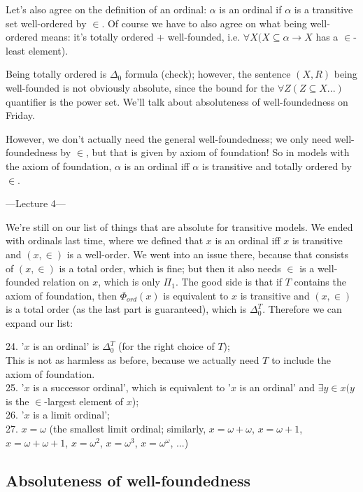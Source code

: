 \documentclass[a4paper]{article}
\begin{document}
Let's also agree on the definition of an ordinal: $\alpha$ is an ordinal if $\alpha$ is a transitive set well-ordered by $\in$. Of course we have to also agree on what being well-ordered means: it's totally ordered + well-founded, i.e. $\forall X (X \subseteq \alpha \to X$ has a $\in$-least element).

Being totally ordered is $\Delta_0$ formula (check); however, the sentence $(X,R)$ being well-founded is not obviously absolute, since the bound for the $\forall Z (Z \subseteq X ...)$ quantifier is the power set. We'll talk about absoluteness of well-foundedness on Friday.

However, we don't actually need the general well-foundedness; we only need well-foundedness by $\in$, but that is given by axiom of foundation! So in models with the axiom of foundation, $\alpha$ is an ordinal iff $\alpha$ is transitive and totally ordered by $\in$.	

---Lecture 4---

We're still on our list of things that are absolute for transitive models. We ended with ordinals last time, where we defined that $x$ is an ordinal iff $x$ is transitive and $(x,\in)$ is a well-order. We went into an issue there, because that consists of $(x,\in)$ is a total order, which is fine; but then it also needs $\in$ is a well-founded relation on $x$, which is only $\Pi_1$. The good side is that if $T$ contains the axiom of foundation, then $\Phi_{ord}(x)$ is equivalent to $x$ is transitive and $(x,\in)$ is a total order (as the last part is guaranteed), which is $\Delta_0^T$. Therefore we can expand our list:

24. '$x$ is an ordinal' is $\Delta_0^T$ (for the right choice of $T$);\\
This is not as harmless as before, because we actually need $T$ to include the axiom of foundation.\\
25. '$x$ is a successor ordinal', which is equivalent to '$x$ is an ordinal' and $\exists y \in x (y$ is the $\in$-largest element of $x$);\\
26. '$x$ is a limit ordinal';\\
27. $x=\omega$ (the smallest limit ordinal; similarly, $x=\omega+\omega$, $x=\omega+1$, $x=\omega+\omega+1$, $x=\omega^2$, $x=\omega^3$, $x=\omega^\omega$, ...)\\

\subsection{Absoluteness of well-foundedness}
\end{document}
